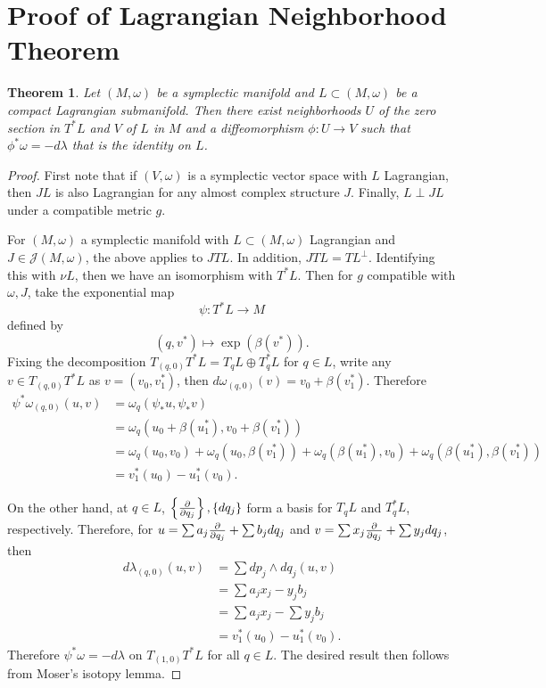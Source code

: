 \documentclass[leqno, openany]{memoir}
\theoremstyle{definition}
\theoremstyle{remark}
\theoremstyle{plain}
\newtheorem*{thm*}{Theorem}
\theoremstyle{definition}
\theoremstyle{remark}
\newcommand{\mc}[1]{\mathcal{#1}}
\begin{document}
    \section{Proof of Lagrangian Neighborhood Theorem}%
    \label{sec:proof_of_lagrangian_neighborhood_theorem}
    
     \begin{thm*}
        Let $(M, \omega)$ be a symplectic manifold and $L \subset (M, \omega)$ be a compact Lagrangian submanifold. Then there exist neighborhoods $U$ of the zero section in $T^*L$ and $V$ of $L$ in $M$ and a diffeomorphism $\phi: U \to V$ such that $\phi^* \omega = - d \lambda$ that is the identity on $L$.
    \end{thm*}

    \begin{proof}
        First note that if $(V, \omega)$ is a symplectic vector space with $L$ Lagrangian, then $JL$ is also Lagrangian for any almost complex structure $J$. Finally, $L \perp JL$ under a compatible metric $g$.

        For $(M, \omega)$ a symplectic manifold with $L \subset (M, \omega)$ Lagrangian and $J \in \mc{J}(M, \omega)$, the above applies to $J TL$. In addition, $JTL = TL^{\perp}$. Identifying this with $\nu L$, then we have an isomorphism with $T^* L$. Then for $g$ compatible with $\omega, J$, take the exponential map
        \[ \psi: T^*L \to M \] defined by
        \[ (q, v^*) \mapsto \exp(\beta(v^*)). \]
        Fixing the decomposition $T_{(q,0)} T^*L = T_qL \oplus T_q^*L$ for $q \in L$, write any $v \in T_{(q,0)} T^*L$ as $v = (v_0, v_1^*)$, then $d \omega_{(q,0)}(v) = v_0 + \beta(v_1^*)$. Therefore
        \begin{align*}
            \psi^* \omega_{(q,0)} (u,v) &= \omega_q(\psi_* u, \psi_*v) \\
                                        &= \omega_q(u_0 + \beta(u_1^*), v_0 + \beta(v_1^*)) \\
                                        &= \omega_q(u_0, v_0) + \omega_q(u_0, \beta(v_1^*)) + \omega_q(\beta(u_1^*), v_0) + \omega_q(\beta(u_1^*), \beta(v_1^*)) \\
                                        &= v_1^*(u_0) - u_1^*(v_0).
        \end{align*}

        On the other hand, at $q \in L$, $\left\{ \pdv{q_j} \right\}, \{ dq_j \}$ form a basis for $T_q L$ and $T_q^* L$, respectively. Therefore, for $u = \sum a_j \pdv{q_j} + \sum b_j dq_j$ and $v = \sum x_j \pdv{q_j} + \sum y_j dq_j$, then
        \begin{align*}
            d \lambda_{(q,0)}(u,v) &= \sum dp_j \wedge dq_j (u,v) \\
                                   &= \sum a_j x_j - y_j b_j \\
                                   &= \sum a_j x_j - \sum y_j b_j \\
                                   &= v_1^*(u_0) - u_1^*(v_0).
        \end{align*}
        Therefore $\psi^* \omega = -d\lambda$ on $T_{(1,0)} T^*L$ for all $q \in L$. The desired result then follows from Moser's isotopy lemma.
    \end{proof}
\end{document}
